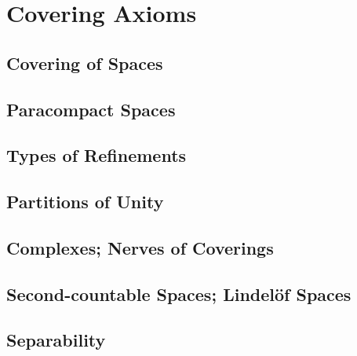 \chapter{Covering Axioms}

\section{Covering of Spaces}

\section{Paracompact Spaces}

\section{Types of Refinements}

\section{Partitions of Unity}

\section{Complexes; Nerves of Coverings}

\section{Second-countable Spaces; Lindel\"{o}f Spaces}

\section{Separability}
